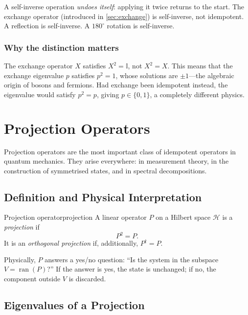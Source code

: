 \documentclass[11pt,a4paper]{article}
\newcommand{\id}{\mathbb{I}}
\newcommand{\hilb}{\mathcal{H}}
\begin{document}
A self-inverse operation \emph{undoes itself}: applying it twice returns
to the start.  The exchange operator (introduced in \cref{sec:exchange}) is
self-inverse, not idempotent.  A reflection is self-inverse.  A $180^\circ$
rotation is self-inverse.

\subsubsection{Why the distinction matters}

The exchange operator $X$ satisfies $X^2 = \id$, not $X^2 = X$.  This means
that the exchange eigenvalue $p$ satisfies $p^2 = 1$, whose solutions are
$\pm 1$---the algebraic origin of bosons and fermions.  Had exchange been
idempotent instead, the eigenvalue would satisfy $p^2 = p$, giving $p \in
\{0,1\}$, a completely different physics.

\section{Projection Operators}

Projection operators are the most important class of idempotent operators in
quantum mechanics.  They arise everywhere: in measurement theory, in the
construction of symmetrised states, and in spectral decompositions.

\subsection{Definition and Physical Interpretation}

\begin{defn}{Projection operator}{projection}
  A linear operator $P$ on a Hilbert space $\hilb$ is a \emph{projection} if
  \[
    P^2 = P.
  \]
  It is an \emph{orthogonal projection} if, additionally, $P^\dagger = P$.
\end{defn}

Physically, $P$ answers a yes/no question: ``Is the system in the subspace
$V = \operatorname{ran}(P)$?''  If the answer is yes, the state is unchanged; if
no, the component outside $V$ is discarded.

\subsection{Eigenvalues of a Projection}
\end{document}
